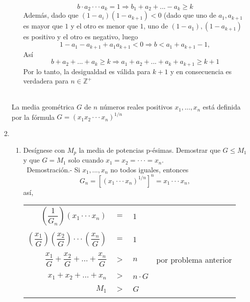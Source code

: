 \begin{enumerate}
\begin{enumerate}[C1]
$$b\cdot a_2 \cdot \cdot \cdot a_k = 1 \Rightarrow b_1 + a_2 + ... - a_k \geq k$$
Además, dado que $(1-a_i)(1-a_{k+1})<0$ (dado que uno de $a_1, a_{k+1}$ es mayor que $1$ y el otro es menor que $1$, uno de $(1-a_1), (1-a_{k+1})$ es positivo y el otro es negativo, luego $$1-a_1-a_{k+1}+a_1a_{k+1}<0 \Rightarrow b<a_1 + a_{k+1}-1,$$
Así
$$b+a_2+...+a_k\geq k \Rightarrow a_1 + a_2 +...+a_k + a_{k+1} \geq k+1$$
Por lo tanto, la desigualdad es válida para $k+1$ y en consecuencia es verdadera para $n\in \mathbb{Z}^+$\\\\
\end{enumerate}

\begin{tcolorbox}[colframe = white]
\begin{def.}
La media geométrica $G$ de $n$ números reales positivos $x_1,...,x_n$ está definida por la fórmula $G=(x_1 x_2 \cdot \cdot \cdot x_n)^{1/n}$
\end{def.}
\end{tcolorbox}
\item 
\begin{enumerate}[\bfseries (a)]
\item Desígnese con $M_p$ la media de potencias p-ésimas. Demostrar que $G \leq M_1$ y que $G=M_1$ solo cuando $x_1 = x_2 = \cdot \cdot \cdot = x_n.$\\\
Demostración.- \; Si $x_1, ... ,x_n$ no todos iguales, entonces $$G_n = \left[ (x_1 \cdot \cdot \cdot x_n)^{1/n} \right]^n = x_1 \cdot \cdot \cdot x_n,$$ así, 
\begin{center}
\begin{tabular}{rcll}
$\left( \dfrac{1}{G_n} \right)(x_1\cdot \cdot \cdot x_n)$&$=$&$1$&\\\\
$\left( \dfrac{x_1}{G} \right) \left( \dfrac{x_2}{G} \right) \cdot \cdot \cdot \left( \dfrac{x_n}{G} \right)$&$=$&$1$&\\\\
$\dfrac{x_1}{G} + \dfrac{x_2}{G} + ... + \dfrac{x_n}{G}$&$>$&$n$& por problema anterior\\\\
$x_1+x_2+...+x_n$&$>$&$n \cdot G$\\\\
$M_1$&$>$&$G$\\\\
\end{tabular}
\end{center}

\end{enumerate}
\end{enumerate}
